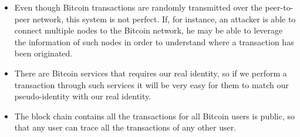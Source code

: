 \begin{itemize}
\item Even though Bitcoin transactions are randomly transmitted over the peer-to-peer network, this system is not perfect. If, for instance, an attacker is able to connect multiple nodes to the Bitcoin network, he may be able to leverage the information of such nodes in order to understand where a transaction has been originated.
\item There are Bitcoin services that requires our real identity, so if we perform a transaction through such services it will be very easy for them to match our pseudo-identity with our real identity.
\item The block chain contains all the transactions for all Bitcoin users is public, so that any user can trace all the transactions of any other user.
\end{itemize}
